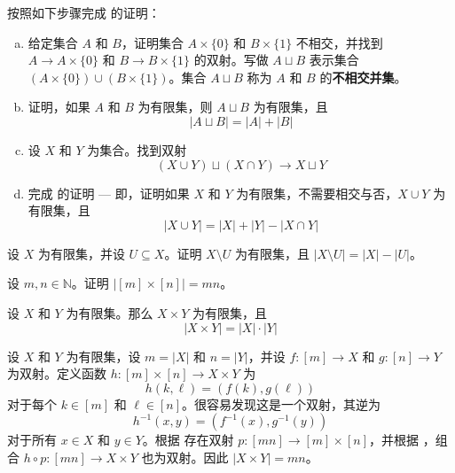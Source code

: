 \begin{exercise}
\label{exSizeOfUnion}
按照如下步骤完成  的证明：
\begin{enumerate}[(a)]
\item 给定集合 $A$ 和 $B$，证明集合 $A \times \{ 0 \}$ 和 $B \times \{ 1 \}$ 不相交，并找到 $A \to A \times \{ 0 \}$ 和 $B \to B \times \{ 1 \}$ 的双射。写做 $A \sqcup B$  表示集合 $(A \times \{ 0 \}) \cup (B \times \{ 1 \})$。集合 $A \sqcup B$ 称为 $A$ 和 $B$ 的\textbf{不相交并集}。
\item 证明，如果 $A$ 和 $B$ 为有限集，则 $A \sqcup B$ 为有限集，且
\[ |A \sqcup B| = |A| + |B| \]
\item 设 $X$ 和 $Y$ 为集合。找到双射
\[ (X \cup Y) \sqcup (X \cap Y) \to X \sqcup Y \]
\item 完成  的证明 --- 即，证明如果 $X$ 和 $Y$ 为有限集，不需要相交与否，$X \cup Y$ 为有限集，且
\[ |X \cup Y| = |X| + |Y| - |X \cap Y| \]
\end{enumerate}
\end{exercise}

\begin{exercise}
设 $X$ 为有限集，并设 $U \subseteq X$。证明 $X \setminus U$ 为有限集，且 $|X \setminus U| = |X| - |U|$。
\end{exercise}

\begin{exercise}
\label{exSizeOfCartesianProduct}
设 $m,n \in \mathbb{N}$。证明 $|[m] \times [n]| = mn$。
\end{exercise}

\begin{proposition}
\label{propProductOfFiniteSetsIsFinite}
设 $X$ 和 $Y$ 为有限集。那么 $X \times Y$ 为有限集，且
\[ |X \times Y| = |X| \cdot |Y| \]
\end{proposition}
\begin{cproof}
设 $X$ 和 $Y$ 为有限集，设 $m=|X|$ 和 $n=|Y|$，并设 $f : [m] \to X$ 和 $g : [n] \to Y$ 为双射。定义函数 $h : [m] \times [n] \to X \times Y$ 为
\[ h(k,\ell) = (f(k),g(\ell)) \]
对于每个 $k \in [m]$ 和 $\ell \in [n]$。很容易发现这是一个双射，其逆为
\[ h^{-1}(x,y) = (f^{-1}(x), g^{-1}(y)) \]
对于所有 $x \in X$ 和 $y \in Y$。根据  存在双射 $p : [mn] \to [m] \times [n]$，并根据 ，组合 $h \circ p : [mn] \to X \times Y$ 也为双射。因此 $|X \times Y| = mn$。
\end{cproof}

